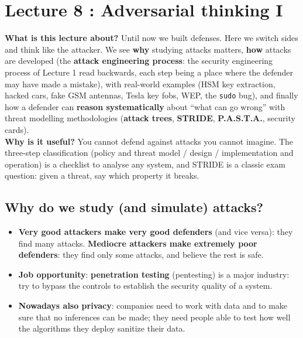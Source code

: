 \chapter{Lecture 8 : Adversarial thinking I}

\begin{rembox}[title=In a nutshell]
\textbf{What is this lecture about?} Until now we built defenses. Here we switch sides and think
like the attacker. We see \textbf{why} studying attacks matters, \textbf{how} attacks are developed
(the \textbf{attack engineering process}: the security engineering process of Lecture 1 read
backwards, each step being a place where the defender may have made a mistake), with real-world
examples (HSM key extraction, hacked cars, fake GSM antennas, Tesla key fobs, WEP, the
\texttt{sudo} bug), and finally how a defender can \textbf{reason systematically} about ``what can
go wrong'' with threat modelling methodologies (\textbf{attack trees}, \textbf{STRIDE},
\textbf{P.A.S.T.A.}, security cards). \\
\textbf{Why is it useful?} You cannot defend against attacks you cannot imagine. The three-step
classification (policy and threat model / design / implementation and operation) is a checklist to
analyse any system, and STRIDE is a classic exam question: given a threat, say which property it
breaks.
\end{rembox}

\section{Why do we study (and simulate) attacks?}

\begin{propbox}[title=Deeper understanding of defense]
\begin{itemize}
  \item \textbf{Very good attackers make very good defenders} (and vice versa): they find many
        attacks. \textbf{Mediocre attackers make extremely poor defenders}: they find only some
        attacks, and believe the rest is safe.
  \item \textbf{Job opportunity}: \textbf{penetration testing} (pentesting) is a major industry:
        try to bypass the controls to establish the security quality of a system.
  \item \textbf{Nowadays also privacy}: companies need to work with data and to make sure that no
        inferences can be made; they need people able to test how well the algorithms they deploy
        sanitize their data.
\end{itemize}
\end{propbox}

